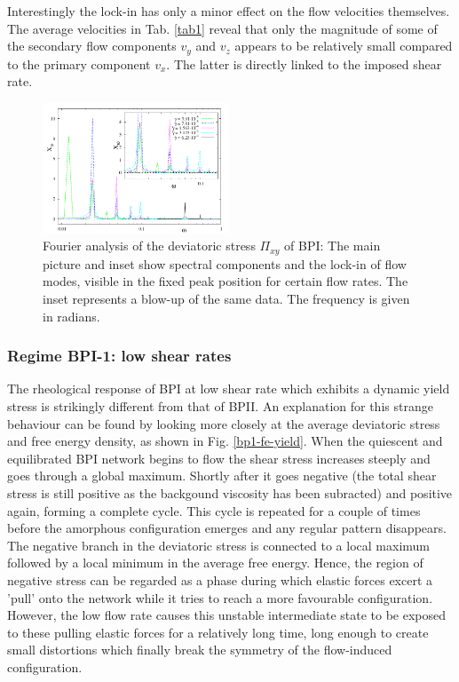 \documentclass[aps,pre,reprint,superscriptaddress, twocolumn]{revtex4}
\begin{document}
Interestingly the lock-in has only a minor effect on the flow velocities themselves.
The average velocities in Tab. \ref{tab1} reveal that only the magnitude of some of the secondary 
flow components $v_y$ and $v_z$ appears to be relatively small compared to the primary component $v_x$. 
The latter is directly linked to the imposed shear rate. 

\begin{figure}[htpb]
\includegraphics[width=0.495\textwidth]{spectrum_bp1.pdf}
\caption{Fourier analysis of the deviatoric stress $\Pi_{xy}$ of BPI: The main picture and inset show spectral
components and the lock-in of flow modes, visible in the fixed peak position for certain flow rates. 
The inset represents a blow-up of the same data. The frequency is given in radians.}
\label{bp1-spectrum}
\end{figure}

\subsubsection{Regime BPI-1: low shear rates}

The rheological response of BPI at low shear rate which exhibits a
dynamic yield stress is strikingly different from that of BPII.
An explanation for this strange behaviour can be found by 
looking more closely at the average deviatoric stress and 
free energy density, as shown in Fig. \ref{bp1-fe-yield}.
When the quiescent and equilibrated BPI network begins to flow
the shear stress increases steeply and goes through a global maximum.
Shortly after it goes negative (the total shear stress is still
positive as the backgound viscosity has been subracted) and positive
again, forming a complete cycle. 
This cycle is repeated for a couple of times before 
the amorphous configuration emerges and any regular pattern
disappears.
The negative branch in the deviatoric stress is connected
to a local maximum followed by a local minimum in the average free energy.
Hence, the region of negative stress can be 
regarded as a phase during which elastic forces excert a 
'pull' onto the network while it tries to reach a more 
favourable configuration. However, the low flow rate
causes this unstable intermediate state to be exposed to these
pulling elastic forces for a relatively long time, long enough to 
create small distortions which finally break the symmetry of the
flow-induced configuration.
\end{document}
